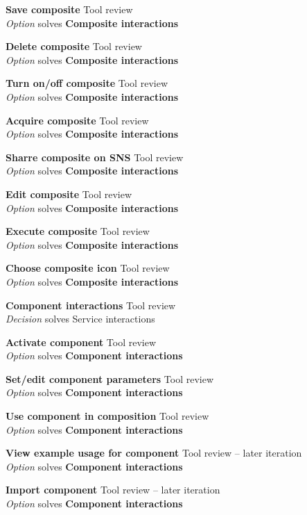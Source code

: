 \textbf{Save composite} \hfill Tool review \\ \emph{Option} \hfill solves \textbf{Composite interactions}

\textbf{Delete composite} \hfill Tool review \\ \emph{Option} \hfill solves \textbf{Composite interactions}

\textbf{Turn on/off composite} \hfill Tool review \\ \emph{Option} \hfill solves \textbf{Composite interactions}

\textbf{Acquire composite} \hfill Tool review \\ \emph{Option} \hfill solves \textbf{Composite interactions}

\textbf{Sharre composite on SNS} \hfill Tool review \\ \emph{Option} \hfill solves \textbf{Composite interactions}

\textbf{Edit composite} \hfill Tool review \\ \emph{Option} \hfill solves \textbf{Composite interactions}

\textbf{Execute composite} \hfill Tool review \\ \emph{Option} \hfill solves \textbf{Composite interactions}

\textbf{Choose composite icon} \hfill Tool review \\ \emph{Option} \hfill solves \textbf{Composite interactions}

\textbf{Component interactions} \hfill Tool review \\ \emph{Decision} \hfill solves {Service interactions}

\textbf{Activate component} \hfill Tool review \\ \emph{Option} \hfill solves \textbf{Component interactions}

\textbf{Set/edit component parameters} \hfill Tool review \\ \emph{Option} \hfill solves \textbf{Component interactions}

\textbf{Use component in composition} \hfill Tool review \\ \emph{Option} \hfill solves \textbf{Component interactions}

\textbf{View example usage for component} \hfill Tool review  -- later iteration \\ \emph{Option} \hfill solves \textbf{Component interactions}

\textbf{Import component} \hfill Tool review  -- later iteration \\ \emph{Option} \hfill solves \textbf{Component interactions}

